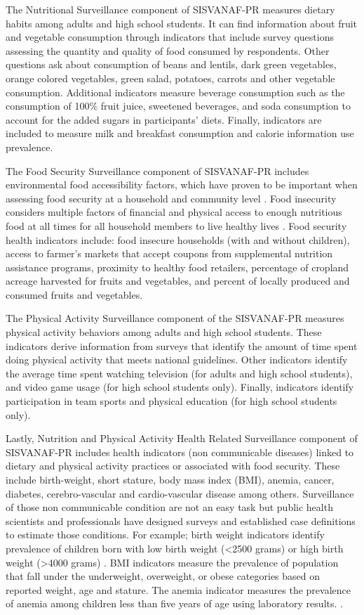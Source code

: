 \documentclass[12pt,letterpaper]{report}
\begin{document}
The Nutritional Surveillance component of SISVANAF-PR measures dietary habits among adults and high school students. It can find information about fruit and vegetable consumption through indicators that include survey questions assessing the quantity and quality of food consumed by respondents. Other questions ask about consumption of beans and lentils, dark green vegetables, orange colored vegetables, green salad, potatoes, carrots and other vegetable consumption. Additional indicators measure beverage consumption such as the consumption of 100\% fruit juice, sweetened beverages, and soda consumption to account for the added sugars in participants' diets. Finally, indicators are included to measure milk and breakfast consumption and calorie information use prevalence.

The Food Security Surveillance component of SISVANAF-PR includes environmental food accessibility factors, which have proven to be important when assessing food security at a household and community level \cite{story2008creating}. Food insecurity considers multiple factors of financial and physical access to enough nutritious food at all times for all household members to live healthy lives \cite{bickel2000guide}. Food security health indicators include: food insecure households (with and without children), access to farmer's markets that accept coupons from supplemental nutrition assistance programs, proximity to healthy food retailers, percentage of cropland acreage harvested for fruits and vegetables, and percent of locally produced and consumed fruits and vegetables. 

The Physical Activity Surveillance component of the SISVANAF-PR measures physical activity behaviors among adults and high school students. These indicators derive information from surveys that identify the amount of time spent doing physical activity that meets national guidelines. Other indicators identify the average time spent watching television (for adults and high school students), and video game usage (for high school students only). Finally, indicators identify participation in team sports and physical education (for high school students only). 

Lastly, Nutrition and Physical Activity Health Related Surveillance component of SISVANAF-PR includes health indicators (non communicable diseases) linked to dietary and physical activity practices or associated with food security. These include birth-weight, short stature, body mass index (BMI), anemia, cancer, diabetes, cerebro-vascular and cardio-vascular disease among others. Surveillance of those non communicable condition are not an easy task but public health scientists and professionals have designed surveys and established case definitions to estimate those conditions.  For example; birth weight indicators identify prevalence of children born with low birth weight (\textless 2500 grams) or high birth weight (\textgreater 4000 grams) \cite{PedNSS}. BMI indicators measure the prevalence of population that fall under the underweight, overweight, or obese categories based on reported weight, age and stature. The anemia indicator measures the prevalence of anemia among children less than five years of age using laboratory results. \cite{PedNSS}.
\end{document}
